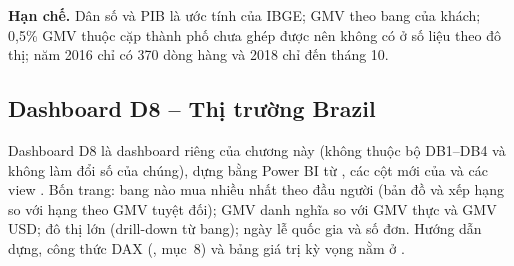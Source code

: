 \textbf{Hạn chế.} Dân số và PIB là ước tính của IBGE; GMV theo bang của khách; 0,5\% GMV thuộc cặp thành phố chưa ghép được nên không có ở số liệu theo đô thị; năm 2016 chỉ có 370 dòng hàng và 2018 chỉ đến tháng 10.

\subsection{Dashboard D8 -- Thị trường Brazil}\label{sec:d8}
Dashboard D8 là dashboard riêng của chương này (không thuộc bộ DB1--DB4 và không làm đổi số của chúng), dựng bằng Power BI từ , các cột mới của  và các view . Bốn trang: bang nào mua nhiều nhất theo đầu người (bản đồ và xếp hạng so với hạng theo GMV tuyệt đối); GMV danh nghĩa so với GMV thực và GMV USD; đô thị lớn (drill-down từ bang); ngày lễ quốc gia và số đơn. Hướng dẫn dựng, công thức DAX (, mục~8) và bảng giá trị kỳ vọng nằm ở .
